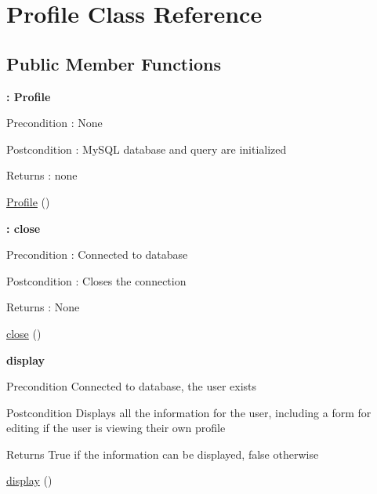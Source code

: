 \hypertarget{class_profile}{}\section{Profile Class Reference}
\label{class_profile}
\subsection*{Public Member Functions}
\begin{Indent}{\bf \+: Profile}\par
{\em \begin{DoxyPrecond}{Precondition}
\+: None 
\end{DoxyPrecond}
\begin{DoxyPostcond}{Postcondition}
\+: My\+S\+QL database and query are initialized 
\end{DoxyPostcond}
\begin{DoxyReturn}{Returns}
\+: none 
\end{DoxyReturn}
}\begin{DoxyCompactItemize}
\item 
\hyperlink{class_profile_a8cf644329324d2729a0af46660d2646e}{Profile} ()
\end{DoxyCompactItemize}
\end{Indent}
\begin{Indent}{\bf \+: close}\par
{\em \begin{DoxyPrecond}{Precondition}
\+: Connected to database 
\end{DoxyPrecond}
\begin{DoxyPostcond}{Postcondition}
\+: Closes the connection 
\end{DoxyPostcond}
\begin{DoxyReturn}{Returns}
\+: None 
\end{DoxyReturn}
}\begin{DoxyCompactItemize}
\item 
\hyperlink{class_profile_aa69c8bf1f1dcf4e72552efff1fe3e87e}{close} ()
\end{DoxyCompactItemize}
\end{Indent}
\begin{Indent}{\bf display}\par
{\em \begin{DoxyPrecond}{Precondition}
Connected to database, the user exists 
\end{DoxyPrecond}
\begin{DoxyPostcond}{Postcondition}
Displays all the information for the user, including a form for editing if the user is viewing their own profile 
\end{DoxyPostcond}
\begin{DoxyReturn}{Returns}
True if the information can be displayed, false otherwise 
\end{DoxyReturn}
}\begin{DoxyCompactItemize}
\item 
\hyperlink{class_profile_a0b9b6e6acd4a839fc7c2f26f96b5cfa8}{display} ()
\end{DoxyCompactItemize}
\end{Indent}
